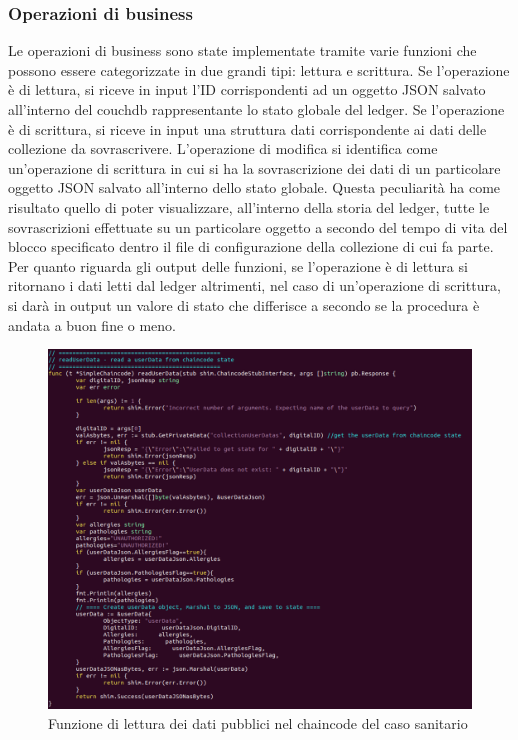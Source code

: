 \subsubsection{Operazioni di business}
Le operazioni di business sono state implementate tramite varie funzioni che possono essere categorizzate in due grandi tipi: lettura e scrittura. Se l'operazione è di lettura, si riceve in input l'ID corrispondenti ad un oggetto JSON salvato all'interno del couchdb rappresentante lo stato globale del ledger. Se l'operazione è di scrittura, si riceve in input una struttura dati corrispondente ai dati delle collezione da sovrascrivere. L'operazione di modifica si identifica come un'operazione di scrittura in cui si ha la sovrascrizione dei dati di un particolare oggetto JSON salvato all'interno dello stato globale. Questa peculiarità ha come risultato quello di poter visualizzare, all'interno della storia del ledger, tutte le sovrascrizioni effettuate su un particolare oggetto a secondo del tempo di vita del blocco specificato dentro il file di configurazione della collezione di cui fa parte. Per quanto riguarda gli output delle funzioni, se l'operazione è di lettura si ritornano i dati letti dal ledger altrimenti, nel caso di un'operazione di scrittura, si darà in output un valore di stato che differisce a secondo se la procedura è andata a buon fine o meno.
\begin{figure}[h]
    \centering
    \includegraphics[width=1\textwidth]{img/function-chaincode.png}
    \caption{Funzione di lettura dei dati pubblici nel chaincode del caso sanitario}
    \label{fig:function-chaincode}
\end{figure}
\newpage
